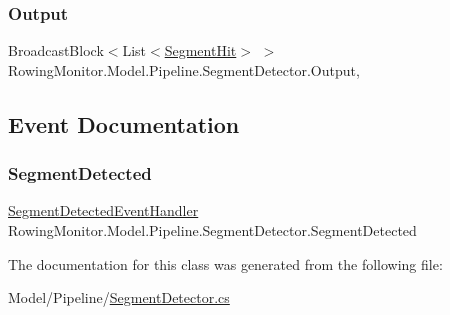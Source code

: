 \subsubsection{\texorpdfstring{Output}{Output}}
{\footnotesize\ttfamily Broadcast\+Block$<$List$<$\hyperlink{struct_rowing_monitor_1_1_model_1_1_util_1_1_segment_hit}{Segment\+Hit}$>$ $>$ Rowing\+Monitor.\+Model.\+Pipeline.\+Segment\+Detector.\+Output\hspace{0.3cm}{\ttfamily [get]}, {\ttfamily [set]}}



\subsection{Event Documentation}
\mbox{\label{class_rowing_monitor_1_1_model_1_1_pipeline_1_1_segment_detector_aecedec106356c5d32e43e9c9471f12a3}} 
\subsubsection{\texorpdfstring{Segment\+Detected}{SegmentDetected}}
{\footnotesize\ttfamily \hyperlink{class_rowing_monitor_1_1_model_1_1_pipeline_1_1_segment_detector_aee5283f7fa49f68c5c4195449442093c}{Segment\+Detected\+Event\+Handler} Rowing\+Monitor.\+Model.\+Pipeline.\+Segment\+Detector.\+Segment\+Detected}



The documentation for this class was generated from the following file\+:\begin{DoxyCompactItemize}
\item 
Model/\+Pipeline/\hyperlink{_segment_detector_8cs}{Segment\+Detector.\+cs}\end{DoxyCompactItemize}
